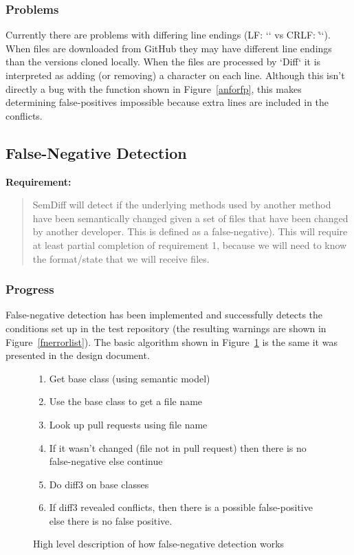 \documentclass[draftclsnofoot,onecolumn]{IEEEtran}
\begin{document}
\subsubsection{Problems}

Currently there are problems with differing line endings (LF: `\n` vs CRLF: 
`\r\n`). When files are downloaded from GitHub they may have different line 
endings than the versions cloned locally. When the files are processed by 
`Diff` it is interpreted as adding (or removing) a character on each line. 
Although this isn’t directly a bug with the function shown in 
Figure~\ref{anforfp}, this makes determining false-positives impossible 
because extra lines are included in the conflicts.






\subsection{False-Negative Detection}

\textbf{Requirement:}

\begin{quote}

SemDiff will detect if the underlying methods used by another method have 
been semantically changed given a set of files that have been changed by 
another developer. This is defined as a false-negative). This will require 
at least partial completion of requirement 1, because we will need to know 
the format/state that we will receive files.

\end{quote}

\subsubsection{Progress}

False-negative detection has been implemented and successfully detects the 
conditions set up in the test repository (the resulting warnings are shown 
in Figure~\ref{fnerrorlist}). The basic algorithm shown in 
Figure~\ref{fnalgore} is the same it was presented in the design document.

\begin{figure}[!t]
\centering
\begin{enumerate}
\item Get base class (using semantic model)
\item Use the base class to get a file name
\item Look up pull requests using file name
\item If it wasn’t changed (file not in pull request) then there is no 
false-negative else continue
\item Do diff3 on base classes
\item If diff3 revealed conflicts, then there is a possible false-positive 
else there is no false positive.
\end{enumerate}
\caption{High level description of how false-negative detection works}
\label{fnalgore}
\end{figure}
\end{document}
